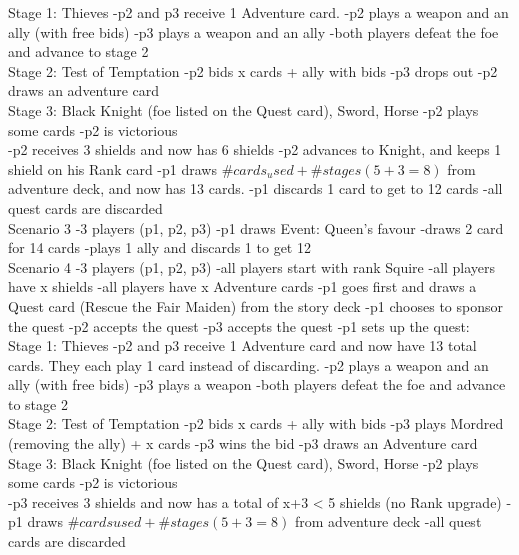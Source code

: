 \documentclass[12pt]{article} %
\begin{document}
Stage 1: Thieves
-p2 and p3 receive 1 Adventure card.
-p2 plays a weapon and an ally (with free bids)
-p3 plays a weapon and an ally
-both players defeat the foe and advance to stage 2\\

Stage 2: Test of Temptation
-p2 bids x cards + ally with bids
-p3 drops out
-p2 draws an adventure card\\

Stage 3: Black Knight (foe listed on the Quest card), Sword, Horse
-p2 plays some cards
-p2 is victorious\\

-p2 receives 3 shields and now has 6 shields
-p2 advances to Knight, and keeps 1 shield on his Rank card
-p1 draws $\#cards_used + \#stages (5 + 3 = 8)$ from adventure deck, and now has 13 cards.
-p1 discards 1 card to get to 12 cards
-all quest cards are discarded\\

Scenario 3
-3 players (p1, p2, p3)
-p1 draws Event: Queen's favour
-draws 2 card for 14 cards
-plays 1 ally and discards 1 to get 12\\

Scenario 4
-3 players (p1, p2, p3)
-all players start with rank Squire
-all players have x shields
-all players have x Adventure cards
-p1 goes first and draws a Quest card (Rescue the Fair Maiden) from the story deck
-p1 chooses to sponsor the quest
-p2 accepts the quest
-p3 accepts the quest
-p1 sets up the quest:\\

Stage 1: Thieves
-p2 and p3 receive 1 Adventure card and now have 13 total cards. They each play 1 card instead of discarding.
-p2 plays a weapon and an ally (with free bids)
-p3 plays a weapon
-both players defeat the foe and advance to stage 2\\

Stage 2: Test of Temptation
-p2 bids x cards + ally with bids
-p3 plays Mordred (removing the ally) + x cards
-p3 wins the bid
-p3 draws an Adventure card\\

Stage 3: Black Knight (foe listed on the Quest card), Sword, Horse
-p2 plays some cards
-p2 is victorious\\

-p3 receives 3 shields and now has a total of x+3 < 5 shields (no Rank upgrade)
-p1 draws $\#cards used + \#stages (5 + 3 = 8)$ from adventure deck
-all quest cards are discarded\\
\end{document}
